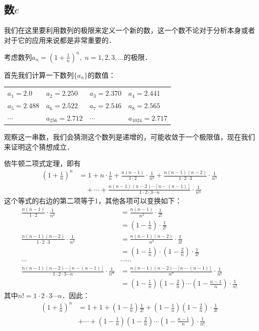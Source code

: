 \subsection{数$e$}
我们在这里要利用数列的极限来定义一个新的数，这一个数不论对于分析本身或者对于它的应用来说都是非常重要的．

考虑数列$a_n=\left(1+\frac{1}{n}\right)^n,\; n=1, 2, 3,\ldots$的极限．

首先我们计算一下数列$\{a_n\}$的数值：
\begin{center}
\begin{tabular}{llll}
   $a_1=2.0$ & $a_2=2.250$ & $a_3=2.370$& $a_4=2.441$\\
$a_5=2.488$ &$a_6=2.522$& $a_7=2.546$& $a_8=2.565$\\
$\cdots$ &$a_{256}=2.712$&$\cdots$&$a_{1024}=2.717$\\ 
\end{tabular}
\end{center}

观察这一串数，我们会猜测这个数列是递增的，可能收敛于一个极限值，现在我们来证明这个猜想成立．

依牛顿二项式定理，即有
\[\begin{split}
    \left(1+\frac{1}{n}\right)^n&=1+n\cdot\frac{1}{n}+\frac{n(n-1)}{1\cdot 2}\cdot \frac{1}{n^2}+\frac{n(n-1)(n-2)}{1\cdot 2\cdot 3}\cdot \frac{1}{n^3}\\
    &\quad +\cdots+\frac{n(n-1)(n-2)\cdots[n-(n-1)]}{1\cdot 2\cdot 3\cdots n}\cdot \frac{1}{n^n}
\end{split}\]
这个等式的右边的第二项等于1，其他各项可以变换如下：
\[\begin{split}
\frac{n(n-1)}{1\cdot 2}\cdot \frac{1}{n^2}&=\frac{n(n-1)}{n^2}\cdot\frac{1}{2!}\\&=\left(1-\frac{1}{n}\right) \cdot\frac{1}{2!}\\
\frac{n(n-1)(n-2)}{1\cdot 2\cdot 3}\cdot \frac{1}{n^3}&=\frac{n(n-1)(n-2)}{n^3}\cdot\frac{1}{3!}\\&=\left(1-\frac{1}{n}\right)\cdot \left(1-\frac{2}{n}\right)\cdot\frac{1}{3!}\\
\cdots & \cdots\cdots\\
\frac{n(n-1)(n-2)\cdots[n-(n-1)]}{1\cdot 2\cdot 3\cdots n}\cdot \frac{1}{n^n}&=\frac{n(n-1)(n-2)\cdots[n-(n-1)]}{n^n}\cdot \frac{1}{n!}\\
&=\left(1-\frac{1}{n}\right) \left(1-\frac{2}{n}\right)\cdots\left(1-\frac{n-1}{n}\right)\cdot\frac{1}{n!}
\end{split}\]
其中$n!=1\cdot 2\cdot 3\cdots n$．因此：
\begin{equation}
\begin{split}
\left(1+\frac{1}{n}\right)^n&=1+1+\left(1-\frac{1}{n}\right)\frac{1}{2!}+ \left(1-\frac{1}{n}\right)\left(1-\frac{2}{n}\right)\cdot\frac{1}{3!}\\
&+\cdots+ \left(1-\frac{1}{n}\right) \left(1-\frac{2}{n}\right)\cdots\left(1-\frac{n-1}{n}\right)\cdot\frac{1}{n!}  
\end{split}
\end{equation}

